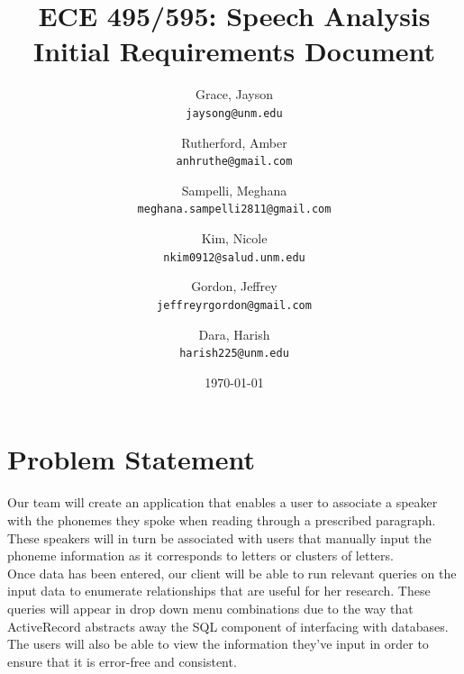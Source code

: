 \documentclass[12pt, a4paper, oneside]{article}
\begin{document}
\title{ECE 495/595: Speech Analysis Initial Requirements Document}
\author{
  Grace, Jayson \\
  \texttt{jaysong@unm.edu}
  \and
  Rutherford, Amber \\
  \texttt{anhruthe@gmail.com}  
  \and
  Sampelli, Meghana \\
  \texttt{meghana.sampelli2811@gmail.com}
  \and
  Kim, Nicole \\
  \texttt{nkim0912@salud.unm.edu}
  \and
  Gordon, Jeffrey \\
  \texttt{jeffreyrgordon@gmail.com}
  \and
  Dara, Harish \\
  \texttt{harish225@unm.edu} 
}
\date{\today}%
\maketitle

\pagebreak
{}

\section*{Problem Statement}
Our team will create an application that enables a user to associate a speaker with the phonemes they spoke when reading through a prescribed paragraph. These speakers will in turn be associated with users that manually input the phoneme information as it corresponds to letters or clusters of letters. \\

Once data has been entered, our client will be able to run relevant queries on the input data to enumerate relationships that are useful for her research. These queries will appear in drop down menu combinations due to the way that ActiveRecord abstracts away the SQL component of interfacing with databases. The users will also be able to view the information they’ve input in order to ensure that it is error-free and consistent.
\end{document}
